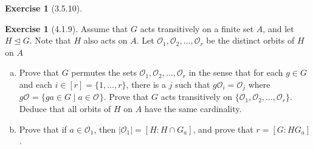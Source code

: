 \documentclass{amsart}
\theoremstyle{plain}
\theoremstyle{definition}
\newtheorem{exer}[lem]{Exercise}
\newcommand{\OO}[1]{\mathcal{O}_{#1}}
\begin{document}
\begin{exer}[3.5.10]
\begin{enumerate}[(a)]
\end{enumerate}
\end{exer}

\begin{exer}[4.1.9]
Assume that $G$ acts transitively on a finite set $A$, and let $H\unlhd G$.
Note that $H$ also acts on $A$. 
Let $\OO{1}, \OO 2,\ldots,\OO r$ be the distinct orbits of $H$ on $A$
\begin{enumerate}[(a)]
\item Prove that $G$ permutes the sets $\OO{1}, \OO 2,\ldots,\OO r$ in the sense that for each $g\in G$
and each $i\in[r]=\{1,\ldots,r\}$, there is a $j$ such that $g\OO i=\OO j$ where $g\OO{}=\{ga\in G\mid a\in\OO{}\}$.
Prove that $G$ acts transitively on $\{\OO{1}, \OO 2,\ldots,\OO r\}$. Deduce that all orbits of $H$ on $A$ have the same cardinality.
\item
Prove that if $a\in\OO 1$, then $|\OO 1|=[H\colon H\cap G_a]$, and prove that $r=[G\colon HG_a]$. 
\end{enumerate}
\end{exer}
\end{document}
